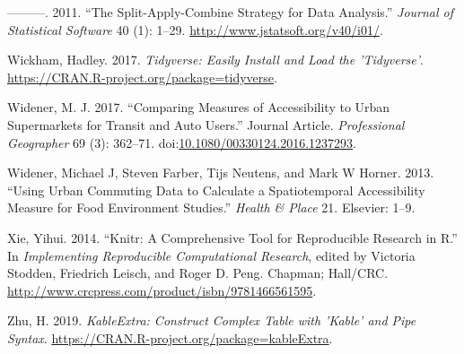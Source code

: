 \documentclass[]{elsarticle} %
\begin{document}
\hypertarget{ref-Wickham2011plyr}{}
---------. 2011. ``The Split-Apply-Combine Strategy for Data Analysis.''
\emph{Journal of Statistical Software} 40 (1): 1--29.
\url{http://www.jstatsoft.org/v40/i01/}.

\hypertarget{ref-Wickham2017tidyverse}{}
Wickham, Hadley. 2017. \emph{Tidyverse: Easily Install and Load the
'Tidyverse'}. \url{https://CRAN.R-project.org/package=tidyverse}.

\hypertarget{ref-Widener2017}{}
Widener, M. J. 2017. ``Comparing Measures of Accessibility to Urban
Supermarkets for Transit and Auto Users.'' Journal Article.
\emph{Professional Geographer} 69 (3): 362--71.
doi:\href{https://doi.org/10.1080/00330124.2016.1237293}{10.1080/00330124.2016.1237293}.

\hypertarget{ref-widener2013using}{}
Widener, Michael J, Steven Farber, Tijs Neutens, and Mark W Horner.
2013. ``Using Urban Commuting Data to Calculate a Spatiotemporal
Accessibility Measure for Food Environment Studies.'' \emph{Health \&
Place} 21. Elsevier: 1--9.

\hypertarget{ref-knitr2014}{}
Xie, Yihui. 2014. ``Knitr: A Comprehensive Tool for Reproducible
Research in R.'' In \emph{Implementing Reproducible Computational
Research}, edited by Victoria Stodden, Friedrich Leisch, and Roger D.
Peng. Chapman; Hall/CRC.
\url{http://www.crcpress.com/product/isbn/9781466561595}.

\hypertarget{ref-Zhu2018}{}
Zhu, H. 2019. \emph{KableExtra: Construct Complex Table with 'Kable' and
Pipe Syntax}. \url{https://CRAN.R-project.org/package=kableExtra}.
\end{document}
